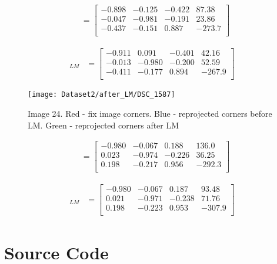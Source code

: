 \documentclass[11pt]{article}
\begin{document}
\begin{align*}
[\mathbf{R}|t] &= \begin{bmatrix} 
-0.898 & -0.125 & -0.422 & 87.38 \\
-0.047 & -0.981 & -0.191 & 23.86 \\
-0.437 & -0.151 & 0.887 & -273.7\\
\end{bmatrix}
\end{align*}

\begin{align*}
[\mathbf{R}|t]_{LM} &= \begin{bmatrix} 
-0.911 & 0.091 & -0.401 & 42.16 \\
-0.013 & -0.980 & -0.200 & 52.59 \\
-0.411 & -0.177 & 0.894 & -267.9\\
\end{bmatrix}
\end{align*}

\begin{figure}[H]
\centering
\texttt{[image: Dataset2/after\_LM/DSC\_1587]}
\caption{Image 24. Red - fix image corners. Blue - reprojected corners before LM. Green - reprojected corners after LM}
\label{}
\end{figure}

\begin{align*}
[\mathbf{R}|t] &= \begin{bmatrix} 
-0.980 & -0.067 & 0.188 & 136.0 \\
0.023 & -0.974 & -0.226 & 36.25 \\
0.198 & -0.217 & 0.956 & -292.3\\
\end{bmatrix}
\end{align*}

\begin{align*}
[\mathbf{R}|t]_{LM} &= \begin{bmatrix} 
-0.980 & -0.067 & 0.187 & 93.48 \\
0.021 & -0.971 & -0.238 & 71.76 \\
0.198 & -0.223 & 0.953 & -307.9\\
\end{bmatrix}
\end{align*}

\newpage
\section*{Source Code}
\end{document}
